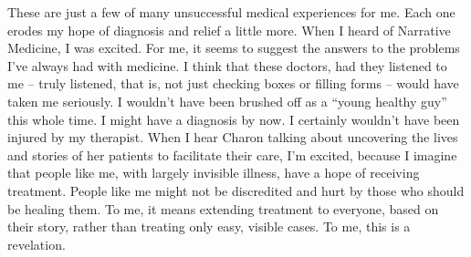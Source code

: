 \documentclass[doc,12pt]{apa6}
\begin{document}
These are just a few of many unsuccessful medical experiences for me. Each one
erodes my hope of diagnosis and relief a little more. When I heard of Narrative
Medicine, I was excited. For me, it seems to suggest the answers to the
problems I've always had with medicine. I think that these doctors, had they
listened to me -- truly listened, that is, not just checking boxes or filling
forms -- would have taken me seriously. I wouldn't have been brushed off as a
``young healthy guy'' this whole time. I might have a diagnosis by now. I
certainly wouldn't have been injured by my therapist. When I hear Charon
talking about uncovering the lives and stories of her patients to facilitate
their care, I'm excited, because I imagine that people like me, with largely
invisible illness, have a hope of receiving treatment. People like me might not
be discredited and hurt by those who should be healing them. To me, it means
extending treatment to everyone, based on their story, rather than treating
only easy, visible cases. To me, this is a revelation.
\end{document}

